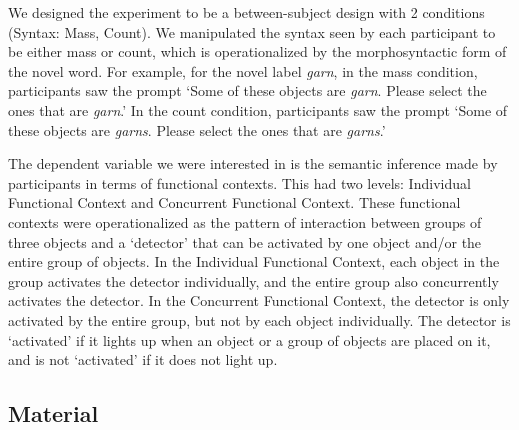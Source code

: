 \documentclass[
  man,floatsintext]{apa6}
\begin{document}
We designed the experiment to be a between-subject design with 2 conditions (Syntax: Mass, Count). We manipulated the syntax seen by each participant to be either mass or count, which is operationalized by the morphosyntactic form of the novel word. For example, for the novel label \emph{garn}, in the mass condition, participants saw the prompt `Some of these objects are \emph{garn}. Please select the ones that are \emph{garn}.' In the count condition, participants saw the prompt `Some of these objects are \emph{garns}. Please select the ones that are \emph{garns}.'

The dependent variable we were interested in is the semantic inference made by participants in terms of functional contexts. This had two levels: Individual Functional Context and Concurrent Functional Context. These functional contexts were operationalized as the pattern of interaction between groups of three objects and a `detector' that can be activated by one object and/or the entire group of objects. In the Individual Functional Context, each object in the group activates the detector individually, and the entire group also concurrently activates the detector. In the Concurrent Functional Context, the detector is only activated by the entire group, but not by each object individually. The detector is `activated' if it lights up when an object or a group of objects are placed on it, and is not `activated' if it does not light up.

\hypertarget{material}{%
\subsection{Material}\label{material}}
\end{document}
